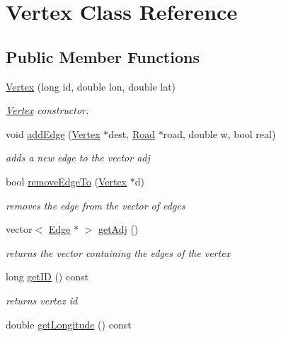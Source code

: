 \hypertarget{class_vertex}{}\section{Vertex Class Reference}
\label{class_vertex}
\subsection*{Public Member Functions}
\begin{DoxyCompactItemize}
\item 
\hyperlink{class_vertex_a86617d6104f1672228e17fd113cb2201}{Vertex} (long id, double lon, double lat)
\begin{DoxyCompactList}\small\item\em \hyperlink{class_vertex}{Vertex} constructor. \end{DoxyCompactList}\item 
void \hyperlink{class_vertex_a30935930ace7706cbd95d4b96a7fdb84}{add\+Edge} (\hyperlink{class_vertex}{Vertex} $\ast$dest, \hyperlink{class_road}{Road} $\ast$road, double w, bool real)
\begin{DoxyCompactList}\small\item\em adds a new edge to the vector adj \end{DoxyCompactList}\item 
bool \hyperlink{class_vertex_a0fb9defc6bc64bd16e51bcf867c511cf}{remove\+Edge\+To} (\hyperlink{class_vertex}{Vertex} $\ast$d)
\begin{DoxyCompactList}\small\item\em removes the edge from the vector of edges \end{DoxyCompactList}\item 
vector$<$ \hyperlink{class_edge}{Edge} $\ast$ $>$ \hyperlink{class_vertex_af82c54a43ccbef87e0e8d3b5e406923e}{get\+Adj} ()
\begin{DoxyCompactList}\small\item\em returns the vector containing the edges of the vertex \end{DoxyCompactList}\item 
long \hyperlink{class_vertex_aa87c2ee75727a9fe1f53379d3ff7632e}{get\+ID} () const
\begin{DoxyCompactList}\small\item\em returns vertex id \end{DoxyCompactList}\item 
double \hyperlink{class_vertex_af1a2bee6c38f511cbfea082eb7149537}{get\+Longitude} () const

\end{DoxyCompactItemize}
